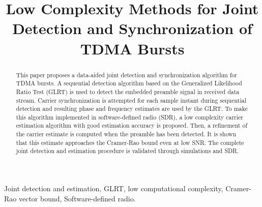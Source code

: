 \documentclass[10pt,final,conference,comsoc]{IEEEtran}
\begin{document}
\title{Low Complexity Methods for Joint Detection and Synchronization of TDMA Bursts
}

\author{
}

\maketitle


\begin{abstract}

This paper proposes a data-aided joint detection and synchronization algorithm for TDMA bursts.
A sequential detection algorithm based on the Generalized Likelihood Ratio Test (GLRT) is used to 
detect the embedded preamble signal in received data stream. 
Carrier synchronization is attempted for each sample instant during sequential detection and
resulting phase and frequency estimates are used by the GLRT. 
To make this algorithm implemented in software-defined radio (SDR),
a low complexity carrier estimation algorithm with good estimation accuracy is proposed.
Then, a refinement of the carrier estimate is computed when the preamble has been detected.
It is shown that this estimate approaches the Cramer-Rao bound even at low SNR. 
The complete joint detection and estimation procedure is validated through simulations and SDR.

\end{abstract}

\begin{IEEEkeywords}
Joint detection and estimation, GLRT, low computational complexity, Cramer-Rao vector bound, Software-defined radio.
\end{IEEEkeywords}


















\end{document}
